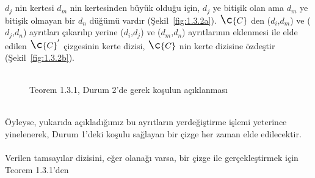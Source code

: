 \documentclass[11pt]{amsbook}
\begin{document}
	
	\bigskip\\\\
	$d_j$ nin kertesi $d_m$ nin kertesinden büyük olduğu
	için, $d_j$ ye bitişik olan ama $d_m$ ye bitişik olmayan
	bir $d_n$ düğümü vardır (Şekil~\ref{fig:1.3.2a}). 
	$\Large\c{C}$ den ($d_i$,$d_m$) ve ($d_j$,$d_n$)
	ayrıtları çıkarılıp yerine ($d_i$,$d_j$) ve ($d_m$,$d_n$)
	ayrıtlarının eklenmesi ile elde edilen $\Large\c{C}^\prime$
	çizgesinin kerte dizisi, $\Large\c{C}$ nin kerte dizisine özdeştir
	(Şekil~\ref{fig:1.3.2b}).
	\\\\
	\begin{figure}[h]
		\centering
		\quad
		\label{fig:1.3.2}
		\caption{Teorem 1.3.1, Durum 2'de gerek koşulun açıklanması}
	\end{figure}
	
	\bigskip\noindent\\
	Öyleyse, yukarıda açıkladığımız bu ayrıtların yerdeğiştirme işlemi
	yeterince yinelenerek, Durum 1'deki koşulu sağlayan bir çizge her 
	zaman elde edilecektir.
	\\\\
	Verilen tamsayılar dizisini, eğer olanağı varsa, bir çizge ile 
	gerçekleştirmek için Teorem 1.3.1'den
	
\end{document}
